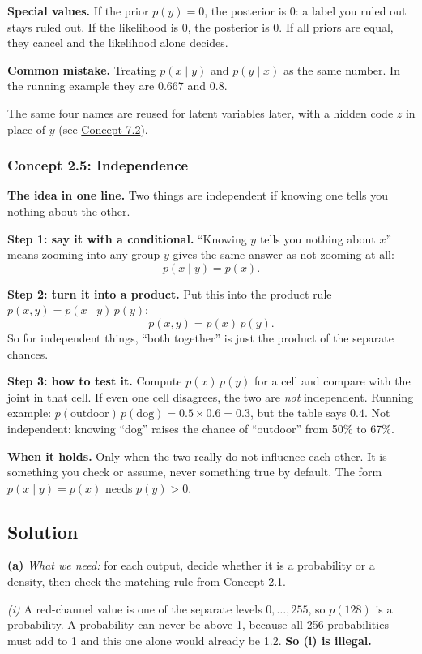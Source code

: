 \documentclass[12pt,a4paper]{article}
\begin{document}
\textbf{Special values.} If the prior $p(y)=0$, the posterior is 0: a label you ruled out stays ruled out. If the likelihood is 0, the posterior is 0. If all priors are equal, they cancel and the likelihood alone decides.

\textbf{Common mistake.} Treating $p(x\mid y)$ and $p(y\mid x)$ as the same number. In the running example they are 0.667 and 0.8.

The same four names are reused for latent variables later, with a hidden code $z$ in place of $y$ (see \hyperref[c7-2]{Concept 7.2}).

\subsubsection{Concept 2.5: Independence}\label{c2-5}

\textbf{The idea in one line.} Two things are independent if knowing one tells you nothing about the other.

\textbf{Step 1: say it with a conditional.} ``Knowing $y$ tells you nothing about $x$'' means zooming into any group $y$ gives the same answer as not zooming at all:
\[
p(x\mid y)=p(x).
\]

\textbf{Step 2: turn it into a product.} Put this into the product rule $p(x,y)=p(x\mid y)\,p(y)$:
\[
p(x,y)=p(x)\,p(y).
\]
So for independent things, ``both together'' is just the product of the separate chances.

\textbf{Step 3: how to test it.} Compute $p(x)\,p(y)$ for a cell and compare with the joint in that cell. If even one cell disagrees, the two are \emph{not} independent. Running example: $p(\text{outdoor})\,p(\text{dog})=0.5\times0.6=0.3$, but the table says $0.4$. Not independent: knowing ``dog'' raises the chance of ``outdoor'' from 50\% to 67\%.

\textbf{When it holds.} Only when the two really do not influence each other. It is something you check or assume, never something true by default. The form $p(x\mid y)=p(x)$ needs $p(y)>0$.

\subsection{Solution}

\textbf{(a)} \emph{What we need:} for each output, decide whether it is a probability or a density, then check the matching rule from \hyperref[c2-1]{Concept 2.1}.

\emph{(i)} A red-channel value is one of the separate levels $0,\dots,255$, so $p(128)$ is a probability. A probability can never be above 1, because all 256 probabilities must add to 1 and this one alone would already be 1.2. \textbf{So (i) is illegal.}
\end{document}
